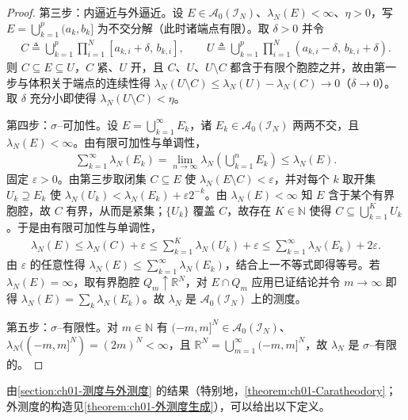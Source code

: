 \documentclass[../../main.tex]{subfiles}%
\begin{document}
\begin{proof}
第三步：内逼近与外逼近。设 $E\in\mathcal{A}_0(\mathcal{I}_N)$、$\lambda_N(E)<\infty$、$\eta>0$，写 $E=\bigcup_{k=1}^p(a_k,b_k]$ 为不交分解（此时诸端点有限）。取 $\delta>0$ 并令
\begin{align*}
C\triangleq\bigcup_{k=1}^p\prod_{i=1}^N[a_{k,i}+\delta,\,b_{k,i}],\qquad
U\triangleq\bigcup_{k=1}^p\prod_{i=1}^N(a_{k,i}-\delta,\,b_{k,i}+\delta).
\end{align*}
则 $C\subseteq E\subseteq U$，$C$ 紧、$U$ 开，且 $C$、$U$、$U\setminus C$ 都含于有限个胞腔之并，故由第一步与体积关于端点的连续性得 $\lambda_N(U\setminus C)\leqslant\lambda_N(U)-\lambda_N(C)\to0$（$\delta\to0$）。取 $\delta$ 充分小即使得 $\lambda_N(U\setminus C)<\eta$。

第四步：$\sigma$--可加性。设 $E=\bigcup_{k=1}^\infty E_k$，诸 $E_k\in\mathcal{A}_0(\mathcal{I}_N)$ 两两不交，且 $\lambda_N(E)<\infty$。由有限可加性与单调性，
\begin{align*}
\sum_{k=1}^\infty\lambda_N(E_k)=\lim_{n\to\infty}\lambda_N\left(\bigcup_{k=1}^nE_k\right)\leqslant\lambda_N(E).
\end{align*}
固定 $\varepsilon>0$。由第三步取闭集 $C\subseteq E$ 使 $\lambda_N(E\setminus C)<\varepsilon$，并对每个 $k$ 取开集 $U_k\supseteq E_k$ 使 $\lambda_N(U_k)<\lambda_N(E_k)+\varepsilon2^{-k}$。由 $\lambda_N(E)<\infty$ 知 $E$ 含于某个有界胞腔，故 $C$ 有界，从而是紧集；$\{U_k\}$ 覆盖 $C$，故存在 $K\in\mathbb{N}$ 使得 $C\subseteq\bigcup_{k=1}^KU_k$。于是由有限可加性与单调性，
\begin{align*}
\lambda_N(E)\leqslant\lambda_N(C)+\varepsilon\leqslant\sum_{k=1}^K\lambda_N(U_k)+\varepsilon\leqslant\sum_{k=1}^\infty\lambda_N(E_k)+2\varepsilon.
\end{align*}
由 $\varepsilon$ 的任意性得 $\lambda_N(E)\leqslant\sum_{k=1}^\infty\lambda_N(E_k)$，结合上一不等式即得等号。若 $\lambda_N(E)=\infty$，取有界胞腔 $Q_m\uparrow\mathbb{R}^N$，对 $E\cap Q_m$ 应用已证结论并令 $m\to\infty$ 即得 $\lambda_N(E)=\sum_k\lambda_N(E_k)$。故 $\lambda_N$ 是 $\mathcal{A}_0(\mathcal{I}_N)$ 上的测度。

第五步：$\sigma$--有限性。对 $m\in\mathbb{N}$ 有 $(-m,m]^N\in\mathcal{A}_0(\mathcal{I}_N)$、$\lambda_N((-m,m]^N)=(2m)^N<\infty$，且 $\mathbb{R}^N=\bigcup_{m=1}^\infty(-m,m]^N$，故 $\lambda_N$ 是 $\sigma$--有限的。
\end{proof}

由\cref{section:ch01-测度与外测度} 的结果（特别地，\cref{theorem:ch01-Caratheodory}；外测度的构造见\cref{theorem:ch01-外测度生成}），可以给出以下定义。
\end{document}
